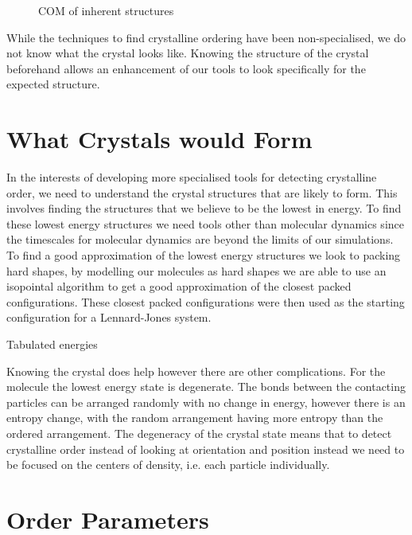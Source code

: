 \begin{figure}
    \caption{COM of inherent structures}
    \label{fig:inherent structures com}
\end{figure}

While the techniques to find crystalline ordering have been non-specialised, we do not know what the crystal looks like. Knowing the structure of the crystal beforehand allows an enhancement of our tools to look specifically for the expected structure.

\section{What Crystals would Form}

In the interests of developing more specialised tools for detecting crystalline order, we need to understand the crystal structures that are likely to form. This involves finding the structures that we believe to be the lowest in energy. To find these lowest energy structures we need tools other than molecular dynamics since the timescales for molecular dynamics are beyond the limits of our simulations. To find a good approximation of the lowest energy structures we look to packing hard shapes, by modelling our molecules as hard shapes we are able to use an isopointal algorithm to get a good approximation of the closest packed configurations. These closest packed configurations were then used as the starting configuration for a Lennard-Jones system.

\begin{table}
    \caption{Tabulated energies}
\end{table}

Knowing the crystal does help however there are other complications. For the \scon molecule the lowest energy state is degenerate. The bonds between the contacting particles can be arranged randomly with no change in energy, however there is an entropy change, with the random arrangement having more entropy than the ordered arrangement. The degeneracy of the \scon crystal state means that to detect crystalline order instead of looking at orientation and position instead we need to be focused on the centers of density, i.e. each particle individually.

\section{Order Parameters}


